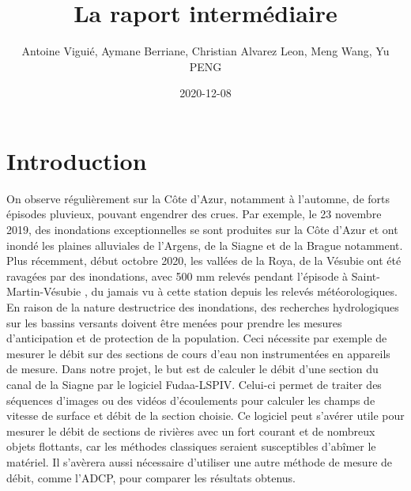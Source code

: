 \documentclass[
]{article}
\title{La raport intermédiaire}
\author{Antoine Viguié, Aymane Berriane, Christian Alvarez Leon, Meng Wang, Yu PENG}
\date{2020-12-08}
\begin{document}






{
\setcounter{tocdepth}{2}
\tableofcontents
}


\newpage

\hypertarget{introduction}{%
\section*{Introduction}\label{introduction}}

On observe régulièrement sur la Côte d'Azur, notamment à l'automne, de forts épisodes pluvieux, pouvant engendrer des crues. Par exemple, le 23 novembre 2019, des inondations exceptionnelles se sont produites sur la Côte d'Azur et ont inondé les plaines alluviales de l'Argens, de la Siagne et de la Brague notamment. Plus récemment, début octobre 2020, les vallées de la Roya, de la Vésubie ont été ravagées par des inondations, avec 500 mm relevés pendant l'épisode à Saint-Martin-Vésubie \citep{noauthor_meteo-france_nodate}, du jamais vu à cette station depuis les relevés météorologiques. En raison de la nature destructrice des inondations, des recherches hydrologiques sur les bassins versants doivent être menées pour prendre les mesures d'anticipation et de protection de la population. Ceci nécessite par exemple de mesurer le débit sur des sections de cours d'eau non instrumentées en appareils de mesure. Dans notre projet, le but est de calculer le débit d'une section du canal de la Siagne par le logiciel Fudaa-LSPIV. Celui-ci permet de traiter des séquences d'images ou des vidéos d'écoulements pour calculer les champs de vitesse de surface et débit de la section choisie. Ce logiciel peut s'avérer utile pour mesurer le débit de sections de rivières avec un fort courant et de nombreux objets flottants, car les méthodes classiques seraient susceptibles d'abîmer le matériel. Il s'avèrera aussi nécessaire d'utiliser une autre méthode de mesure de débit, comme l'ADCP, pour comparer les résultats obtenus.
\end{document}
